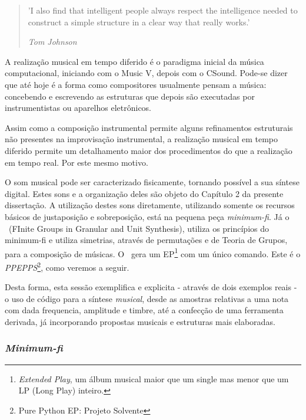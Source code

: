 \begin{quotation}
\small 'I also find that intelligent people always respect the intelligence needed to construct a simple structure in a clear way that really works.'

\emph{Tom Johnson}
\end{quotation}

A realização musical em tempo diferido é o paradigma inicial da música
computacional, iniciando com o Music V, depois
com o CSound. Pode-se dizer que até hoje é a forma como
compositores usualmente pensam a música: concebendo e escrevendo as
estruturas que depois são executadas por instrumentistas ou aparelhos
eletrônicos.

Assim como a composição instrumental permite alguns refinamentos estruturais não presentes na improvisação instrumental,
a realização musical em
tempo diferido permite um detalhamento maior dos
procedimentos do que a realização em tempo real. Por este mesmo
motivo.

O som musical pode ser caracterizado fisicamente, tornando possível a  sua síntese
digital. Estes sons e a organização deles são objeto do Capítulo 2 da presente dissertação.
A utilização destes sons diretamente, utilizando somente os recursos básicos de justaposição e sobreposição, está na pequena peça \emph{minimum-fi}. Já o \figgus\ (FInite Groups in Granular and Unit
Synthesis), utiliza os princípios do minimum-fi e utiliza simetrias, através de
permutações e de Teoria de Grupos, para a composição de músicas.
O \figgus\ gera um
EP\footnote{\emph{Extended Play}, um álbum musical maior que um single mas
  menor que um LP (Long Play) inteiro.} com um único comando. Este é o
\emph{PPEPPS}\footnote{Pure Python EP: Projeto Solvente}, como veremos
a seguir.

Desta forma, esta sessão exemplifica e explicita - através de dois
exemplos reais - o uso de código para a síntese
\emph{musical}, desde as amostras relativas a uma nota com dada
frequencia, amplitude e timbre, até a confecção de uma ferramenta
derivada, já incorporando propostas musicais e estruturas mais
elaboradas.

\subsubsection{\emph{Minimum-fi}}


